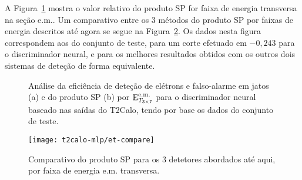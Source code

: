 

A Figura~\ref{fig:best-t2calo-test-efficiency-et} mostra o valor relativo do
produto SP for faixa de energia transversa na seção e.m.. Um comparativo entre
os 3 métodos do produto SP por faixas de energia descritos até agora se segue
na Figura~\ref{fig:best-t2calo-versus-others-emet}. Os dados nesta figura
correspondem aos do conjunto de teste, para um corte efetuado em $-0,243$ para
o discriminador neural, e para os melhores resultados obtidos com os outros
dois sistemas de deteção de forma equivalente.

\begin{figure}
\begin{center}
\end{center}
\caption{Análise da eficiência de deteção de elétrons e falso-alarme em jatos
(a) e do produto SP (b) por $\text{E}^{\text{e.m.}}_{T_{3\times7}}$ para o discriminador neural baseado nas
saídas do T2Calo, tendo por base os dados do conjunto de teste.}
\label{fig:best-t2calo-test-efficiency-et}
\end{figure}

\begin{figure}
\begin{center}
\texttt{[image: t2calo-mlp/et-compare]}
\end{center}
\caption{Comparativo do produto SP para os 3 detetores abordados até aqui, por
faixa de energia e.m. transversa.}
\label{fig:best-t2calo-versus-others-emet}
\end{figure}

